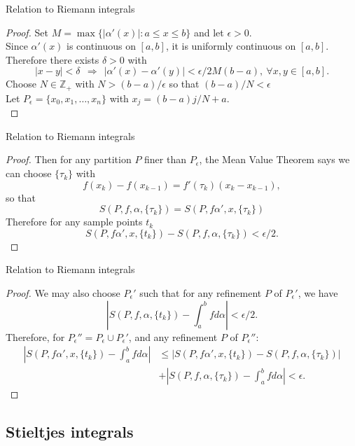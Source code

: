 \documentclass{beamer}
\begin{document}
\begin{frame}{Relation to Riemann integrals}
\begin{proof}
\pause
Set $M=\max \{|\alpha'(x)|: a\leq x \leq b\}$ and let $\epsilon > 0$.\\
\pause
Since $\alpha'(x)$ is continuous on $[a,b]$, it is uniformly continuous on $[a,b]$.\\
\pause
Therefore there exists $\delta > 0$ with
$$|x-y|<\delta\ \ \Rightarrow\ \ |\alpha'(x)-\alpha'(y)| < \epsilon/2M(b-a),\ \forall x,y\in [a,b].$$
\pause
Choose $N\in\mathbb{Z}_+$ with $N>(b-a)/\epsilon$ so that $(b-a)/N < \epsilon$\\
\pause
Let $P_{\epsilon} = \{x_0,x_1,\dots, x_n\}$ with $x_j = (b-a)j/N + a$.\\
\end{proof}
\end{frame}


\begin{frame}{Relation to Riemann integrals}
\begin{proof}
Then for any partition $P$ finer than $P_\epsilon$, the Mean Value Theorem says we can choose $\{\tau_k\}$ with
$$f(x_k)-f(x_{k-1})=f'(\tau_k)(x_k-x_{k-1}),$$
\pause
so that
$$S(P,f,\alpha,\{\tau_k\}) = S(P,f\alpha',x,\{\tau_k\})$$
\pause
Therefore for any sample points $t_k$
$$S(P,f\alpha',x,\{t_k\}) - S(P,f,\alpha,\{\tau_k\}) < \epsilon /2.$$
\end{proof}
\end{frame}

\begin{frame}{Relation to Riemann integrals}
\begin{proof}
We may also choose $P_\epsilon'$ such that for any refinement $P$ of $P_\epsilon'$, we have
$$\left|S(P,f,\alpha,\{t_k\}) - \int_a^bfd\alpha\right| < \epsilon/2.$$
\pause
Therefore, for $P_\epsilon''=P_\epsilon\cup P_\epsilon'$, and any refinement $P$ of $P_\epsilon''$:
\pause
\begin{align*}
\left|S(P,f\alpha',x,\{t_k\}) - \int_a^bfd\alpha\right| 
&\leq      |S(P,f\alpha',x,\{t_k\})-S(P,f,\alpha,\{\tau_k\})|\\
&+    \left|S(P,f,\alpha,\{\tau_k\})-\int_a^b fd\alpha\right| < \epsilon.
\end{align*}
\end{proof}
\end{frame}

\subsection{Stieltjes integrals}
\end{document}
